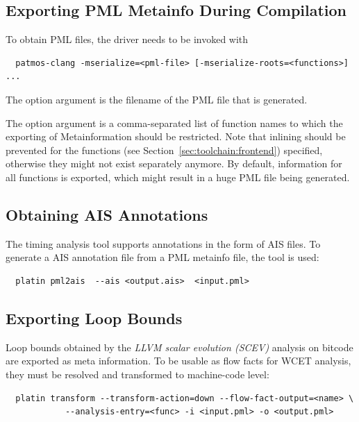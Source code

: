 \subsection{Exporting PML Metainfo During Compilation}

To obtain PML files, the  driver needs to be invoked with


\begin{verbatim}
  patmos-clang -mserialize=<pml-file> [-mserialize-roots=<functions>] ...
\end{verbatim}

The option argument  is the filename of the PML file that is
generated.

The option argument  is a comma-separated list of function
names to which the exporting of Metainformation should be restricted.
Note that inlining should be prevented for the functions (see
Section~\ref{sec:toolchain:frontend}) specified, otherwise they might not exist
separately anymore.
By default, information for all functions is exported, which might result
in a huge PML file being generated.


\subsection{Obtaining AIS Annotations}

The  timing analysis tool supports annotations in the form of
AIS files.
To generate a AIS annotation file from a PML metainfo file, the
 tool is used:

\begin{verbatim}
  platin pml2ais  --ais <output.ais>  <input.pml>
\end{verbatim}


\subsection{Exporting Loop Bounds}

Loop bounds obtained by the \emph{LLVM scalar evolution (SCEV)} analysis
on bitcode are exported as meta information.
%
To be usable as flow facts for WCET analysis, they must be resolved and
transformed to machine-code level:

\begin{verbatim}
  platin transform --transform-action=down --flow-fact-output=<name> \
            --analysis-entry=<func> -i <input.pml> -o <output.pml>
\end{verbatim}

